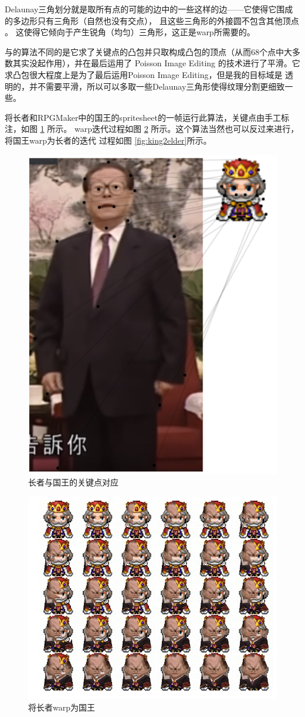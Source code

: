 \documentclass[twocolumn,11pt]{ctexart}
\begin{document}
Delaunay三角划分就是取所有点的可能的边中的一些这样的边——它使得它围成的多边形只有三角形（自然也没有交点），
且这些三角形的外接圆不包含其他顶点\cite{Delaunay} \cite{delaunay1934sphere}。
这使得它倾向于产生锐角（均匀）三角形，这正是warp所需要的。

与\cite{swapface}的算法不同的是它求了关键点的凸包并只取构成凸包的顶点（从而68个点中大多数其实没起作用），并在最后运用了
Poisson Image Editing \cite{perez2003poisson} 的技术进行了平滑。它求凸包很大程度上是为了最后运用Poisson Image Editing，但是我的目标域是
透明的，并不需要平滑，所以可以多取一些Delaunay三角形使得纹理分割更细致一些。

将长者和RPGMaker中的国王的spritesheet的一帧运行此算法，关键点由手工标注，如图 \ref{fig:map} 所示。
warp迭代过程如图 \ref{fig:elder2king} 所示。这个算法当然也可以反过来进行，将国王warp为长者的迭代
过程如图 \ref{fig:king2elder}所示。 

\begin{figure}[htb]
    \centering
    \includegraphics[width=0.5\linewidth]{map.png}
    \caption{长者与国王的关键点对应}
    \label{fig:map}
\end{figure}

\begin{figure}[htb]
    \includegraphics[width=\linewidth]{tri_elder2king.png}
    \caption{将长者warp为国王}
    \label{fig:elder2king}
\end{figure}
\end{document}
